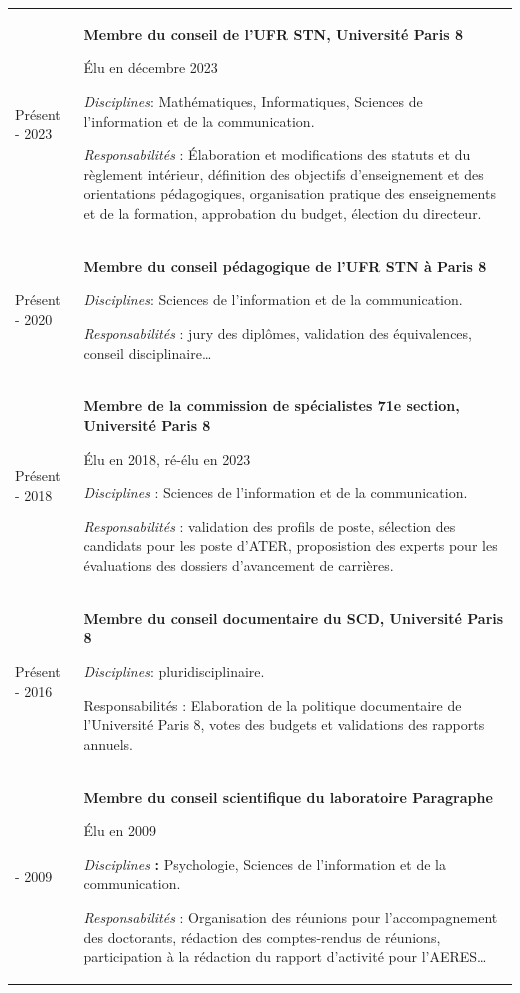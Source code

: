 \documentclass[
  a4paper,
  DIV=11,
  numbers=noendperiod]{scrreprt}
\begin{document}
\begin{longtable}[]{@{}
  >{\raggedright\arraybackslash}p{}
  >{\raggedright\arraybackslash}p{}@{}}
\toprule\noalign{}
\endhead
\bottomrule\noalign{}
\endlastfoot
Présent - 2023 & \textbf{Membre du conseil de l'UFR STN, Université
Paris 8}

Élu en décembre 2023

\emph{Disciplines}: Mathématiques, Informatiques, Sciences de
l'information et de la communication.

\emph{Responsabilités} : Élaboration et modifications des statuts et du
règlement intérieur, définition des objectifs d'enseignement et des
orientations pédagogiques, organisation pratique des enseignements et de
la formation, approbation du budget, élection du directeur. \\
Présent - 2020 & \textbf{Membre du conseil pédagogique de l'UFR STN à
Paris 8}

\emph{Disciplines}: Sciences de l'information et de la communication.

\emph{Responsabilités} : jury des diplômes, validation des équivalences,
conseil disciplinaire\ldots{} \\
Présent - 2018 & \textbf{Membre de la commission de spécialistes 71e
section, Université Paris 8}

Élu en 2018, ré-élu en 2023

\emph{Disciplines} : Sciences de l'information et de la communication.

\emph{Responsabilités} : validation des profils de poste, sélection des
candidats pour les poste d'ATER, proposistion des experts pour les
évaluations des dossiers d'avancement de carrières. \\
Présent - 2016 & \textbf{Membre du conseil documentaire du SCD,
Université Paris 8}

\emph{Disciplines}: pluridisciplinaire.

Responsabilités : Elaboration de la politique documentaire de
l'Université Paris 8, votes des budgets et validations des rapports
annuels. \\
2012 - 2009 & \textbf{Membre du conseil scientifique du laboratoire
Paragraphe}

Élu en 2009

\emph{Disciplines} \textbf{:} Psychologie, Sciences de l'information et
de la communication.

\emph{Responsabilités} : Organisation des réunions pour l'accompagnement
des doctorants, rédaction des comptes-rendus de réunions, participation
à la rédaction du rapport d'activité pour l'AERES\ldots{} \\
\end{longtable}
\end{document}
